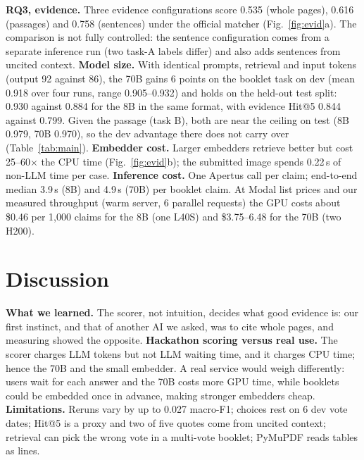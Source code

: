 \documentclass[10pt,a4paper]{article}
\begin{document}
\textbf{RQ3, evidence.} Three evidence configurations score 0.535 (whole pages), 0.616 (passages) and
0.758 (sentences) under the official matcher (Fig.~\ref{fig:evid}a). The comparison is not fully
controlled: the sentence configuration comes from a separate inference run (two task-A labels differ)
and also adds sentences from uncited context.
\textbf{Model size.} With identical prompts, retrieval and input tokens (output 92 against 86), the 70B
gains 6 points on the booklet task on dev (mean 0.918 over four runs, range 0.905--0.932) and holds on
the held-out test split: 0.930 against 0.884 for the 8B in the same format, with evidence Hit@5 0.844
against 0.799. Given the passage (task B), both are near the ceiling on test (8B 0.979, 70B 0.970), so the
dev advantage there does not carry over (Table~\ref{tab:main}).
\textbf{Embedder cost.} Larger embedders retrieve better but cost 25--60$\times$ the CPU time
(Fig.~\ref{fig:evid}b); the submitted image spends 0.22\,s of non-LLM time per case.
\textbf{Inference cost.} One Apertus call per claim; end-to-end median 3.9\,s (8B) and
4.9\,s (70B) per booklet claim. At Modal list prices and our measured throughput (warm server, 6 parallel
requests) the GPU costs about \$0.46 per 1{,}000 claims for the 8B (one L40S) and \$3.75--6.48 for the
70B (two H200).

\section{Discussion}\label{sec:learned}
\textbf{What we learned.} The scorer, not intuition, decides what good evidence is: our first
instinct, and that of another AI we asked, was to cite whole pages, and measuring showed the opposite.
\textbf{Hackathon scoring versus real use.} The scorer charges LLM tokens but not LLM waiting time,
and it charges CPU time; hence the 70B and the small embedder. A real service would weigh differently:
users wait for each answer and the 70B costs more GPU time, while booklets could be embedded once in
advance, making stronger embedders cheap.
\textbf{Limitations.} Reruns vary by up to 0.027 macro-F1; choices rest on 6 dev vote dates; Hit@5 is a proxy and two of five quotes come from uncited context; retrieval can
pick the wrong vote in a multi-vote booklet; PyMuPDF reads tables as lines.
\end{document}
